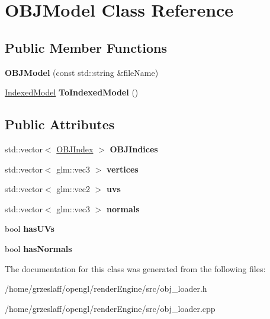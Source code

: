 \hypertarget{classOBJModel}{\section{O\-B\-J\-Model Class Reference}
\label{classOBJModel}
}
\subsection*{Public Member Functions}
\begin{DoxyCompactItemize}
\item 
\hypertarget{classOBJModel_ac33fd4d7e20cd7ca5a82962015e91686}{{\bfseries O\-B\-J\-Model} (const std\-::string \&file\-Name)}\label{classOBJModel_ac33fd4d7e20cd7ca5a82962015e91686}

\item 
\hypertarget{classOBJModel_ad1e4ca6919c26a164aca9fa83523f142}{\hyperlink{classIndexedModel}{Indexed\-Model} {\bfseries To\-Indexed\-Model} ()}\label{classOBJModel_ad1e4ca6919c26a164aca9fa83523f142}

\end{DoxyCompactItemize}
\subsection*{Public Attributes}
\begin{DoxyCompactItemize}
\item 
\hypertarget{classOBJModel_a6522870686168e757385b62214abe37b}{std\-::vector$<$ \hyperlink{structOBJIndex}{O\-B\-J\-Index} $>$ {\bfseries O\-B\-J\-Indices}}\label{classOBJModel_a6522870686168e757385b62214abe37b}

\item 
\hypertarget{classOBJModel_aa1444e5c0ec8249988d5b7a1f54297c6}{std\-::vector$<$ glm\-::vec3 $>$ {\bfseries vertices}}\label{classOBJModel_aa1444e5c0ec8249988d5b7a1f54297c6}

\item 
\hypertarget{classOBJModel_a66d03d734db51477fce847066d472993}{std\-::vector$<$ glm\-::vec2 $>$ {\bfseries uvs}}\label{classOBJModel_a66d03d734db51477fce847066d472993}

\item 
\hypertarget{classOBJModel_af61e5eb97529d47fe8e050fcd0bc976a}{std\-::vector$<$ glm\-::vec3 $>$ {\bfseries normals}}\label{classOBJModel_af61e5eb97529d47fe8e050fcd0bc976a}

\item 
\hypertarget{classOBJModel_a68c309623f6223858524180eac4c8dff}{bool {\bfseries has\-U\-Vs}}\label{classOBJModel_a68c309623f6223858524180eac4c8dff}

\item 
\hypertarget{classOBJModel_a306f4792cc8b11ffdae23de05e299b07}{bool {\bfseries has\-Normals}}\label{classOBJModel_a306f4792cc8b11ffdae23de05e299b07}

\end{DoxyCompactItemize}


The documentation for this class was generated from the following files\-:\begin{DoxyCompactItemize}
\item 
/home/grzeslaff/opengl/render\-Engine/src/obj\-\_\-loader.\-h\item 
/home/grzeslaff/opengl/render\-Engine/src/obj\-\_\-loader.\-cpp\end{DoxyCompactItemize}
